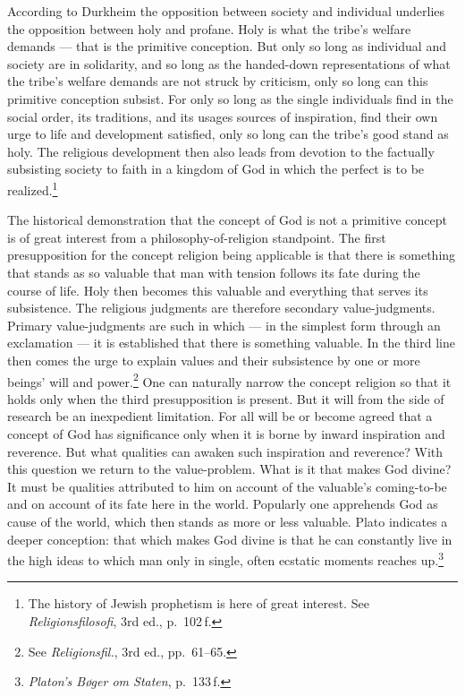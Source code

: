 \documentclass[12pt]{book}
\newcommand{\opage}[1]{\marginnote{\footnotesize\textit{[#1]}}}
\begin{document}
According to Durkheim the opposition between society and individual underlies the opposition between holy and
profane. Holy is what the tribe's welfare demands --- that is the primitive conception. But only so long as
individual and society are in solidarity, and so long as the handed-down representations of what the tribe's
welfare demands are not struck by criticism, only so long can this primitive conception subsist. For only so
long as the single individuals find in the social order, its traditions, and its usages sources \opage{109}of
inspiration, find their own urge to life and development satisfied, only so long can the tribe's good stand as
holy. The religious development then also leads from devotion to the factually subsisting society to faith in
a kingdom of God in which the perfect is to be realized.\footnote{The history of Jewish prophetism is here of
great interest. See \textit{Religionsfilosofi}, 3rd ed., p.\ 102\,f.}

The historical demonstration that the concept of God is not a primitive concept is of great interest from a
philosophy-of-religion standpoint. The first presupposition for the concept religion being applicable is that
there is something that stands as so valuable that man with tension follows its fate during the course of life.
Holy then becomes this valuable and everything that serves its subsistence. The religious judgments are
therefore secondary value-judgments. Primary value-judgments are such in which --- in the simplest form
through an exclamation --- it is established that there is something valuable. In the third line then comes the
urge to explain values and their subsistence by one or more beings' will and power.\footnote{See
\textit{Religionsfil.}, 3rd ed., pp.\ 61--65.} One can naturally narrow the concept religion so that it holds
only when the third presupposition is present. But it will from the side of research be an inexpedient
limitation. For all will be or become agreed that a concept of God has significance only when it is borne by
inward inspiration and reverence. But what qualities can awaken such inspiration and reverence? With this
question we return to the value-problem. What is it that makes God divine? It must be qualities attributed to
him on account of the valuable's coming-to-be and on account of its fate here in the world. \opage{110}Popularly one
apprehends God as cause of the world, which then stands as more or less valuable. Plato indicates a deeper
conception: that which makes God divine is that he can constantly live in the high ideas to which man only in
single, often ecstatic moments reaches up.\footnote{\textit{Platon's Bøger om Staten}, p.\ 133\,f.}
\end{document}
